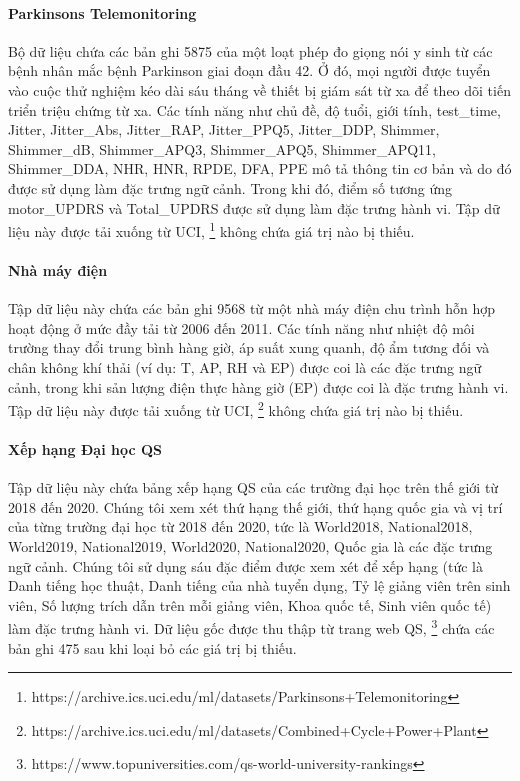\paragraph{Parkinsons Telemonitoring} Bộ dữ liệu chứa các bản ghi 5875 của một loạt phép đo giọng nói y sinh từ các bệnh nhân mắc bệnh Parkinson giai đoạn đầu 42. Ở đó, mọi người được tuyển vào cuộc thử nghiệm kéo dài sáu tháng về thiết bị giám sát từ xa để theo dõi tiến triển triệu chứng từ xa. Các tính năng như chủ đề, độ tuổi, giới tính, test\_time, Jitter, Jitter\_Abs, Jitter\_RAP, Jitter\_PPQ5, Jitter\_DDP, Shimmer, Shimmer\_dB, Shimmer\_APQ3, Shimmer\_APQ5, Shimmer\_APQ11, Shimmer\_DDA, NHR, HNR, RPDE, DFA, PPE mô tả thông tin cơ bản và do đó được sử dụng làm đặc trưng ngữ cảnh. Trong khi đó, điểm số tương ứng motor\_UPDRS và Total\_UPDRS được sử dụng làm đặc trưng hành vi. Tập dữ liệu này được tải xuống từ UCI, \footnote{https://archive.ics.uci.edu/ml/datasets/Parkinsons+Telemonitoring} không chứa giá trị nào bị thiếu.

\paragraph{Nhà máy điện} Tập dữ liệu này chứa các bản ghi 9568 từ một nhà máy điện chu trình hỗn hợp hoạt động ở mức đầy tải từ 2006 đến 2011. Các tính năng như nhiệt độ môi trường thay đổi trung bình hàng giờ, áp suất xung quanh, độ ẩm tương đối và chân không khí thải (ví dụ: T, AP, RH và EP) được coi là các đặc trưng ngữ cảnh, trong khi sản lượng điện thực hàng giờ (EP) được coi là đặc trưng hành vi. Tập dữ liệu này được tải xuống từ UCI, \footnote{https://archive.ics.uci.edu/ml/datasets/Combined+Cycle+Power+Plant} không chứa giá trị nào bị thiếu.\paragraph{Xếp hạng Đại học QS} Tập dữ liệu này chứa bảng xếp hạng QS của các trường đại học trên thế giới từ 2018 đến 2020. Chúng tôi xem xét thứ hạng thế giới, thứ hạng quốc gia và vị trí của từng trường đại học từ 2018 đến 2020, tức là World2018, National2018, World2019, National2019, World2020, National2020, Quốc gia là các đặc trưng ngữ cảnh. Chúng tôi sử dụng sáu đặc điểm được xem xét để xếp hạng (tức là Danh tiếng học thuật, Danh tiếng của nhà tuyển dụng, Tỷ lệ giảng viên trên sinh viên, Số lượng trích dẫn trên mỗi giảng viên, Khoa quốc tế, Sinh viên quốc tế) làm đặc trưng hành vi. Dữ liệu gốc được thu thập từ trang web QS, \footnote{https://www.topuniversities.com/qs-world-university-rankings} chứa các bản ghi 475 sau khi loại bỏ các giá trị bị thiếu.

